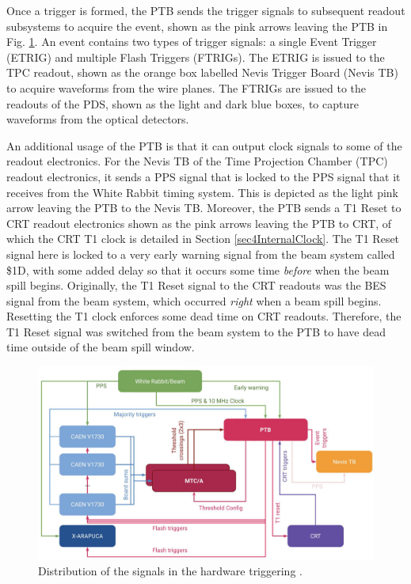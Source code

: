 Once a trigger is formed, the PTB sends the trigger signals to subsequent readout subsystems to acquire the event, shown as the pink arrows leaving the PTB in Fig. \ref{fig:SBND_Trigger}.
An event contains two types of trigger signals: a single Event Trigger (ETRIG) and multiple Flash Triggers (FTRIGs).
The ETRIG is issued to the TPC readout, shown as the orange box labelled Nevis Trigger Board (Nevis TB) to acquire waveforms from the wire planes.
The FTRIGs are issued to the readouts of the PDS, shown as the light and dark blue boxes, to capture waveforms from the optical detectors.

An additional usage of the PTB is that it can output clock signals to some of the readout electronics.
For the Nevis TB of the Time Projection Chamber (TPC) readout electronics, it sends a PPS signal that is locked to the PPS signal that it receives from the White Rabbit timing system.
This is depicted as the light pink arrow leaving the PTB to the Nevis TB.
Moreover, the PTB sends a T1 Reset to CRT readout electronics shown as the pink arrows leaving the PTB to CRT, of which the CRT T1 clock is detailed in Section \ref{sec4InternalClock}.
The T1 Reset signal here is locked to a very early warning signal from the beam system called \$1D, with some added delay so that it occurs some time \textit{before} when the beam spill begins.
Originally, the T1 Reset signal to the CRT readouts was the BES signal from the beam system, which occurred \textit{right} when a beam spill begins.
Resetting the T1 clock enforces some dead time on CRT readouts.
Therefore, the T1 Reset signal was switched from the beam system to the PTB to have dead time outside of the beam spill window.  

\begin{figure}[hb!] 
\centering    
\includegraphics[width=1.0\textwidth]{SBND_Trigger}
\caption[Hardware Triggering Distribution]{
Distribution of the signals in the hardware triggering \cite{ptb_gvs}.
}
\label{fig:SBND_Trigger}
\end{figure}
